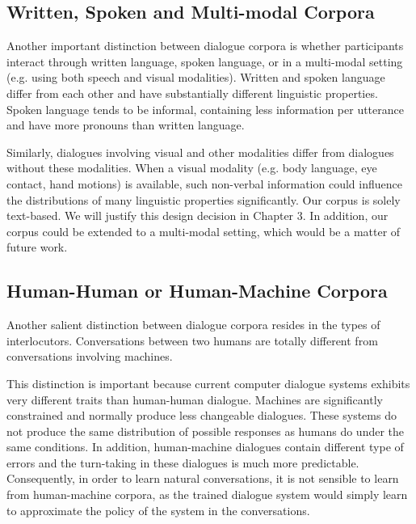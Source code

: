 \documentclass[bsc,frontabs,twoside,singlespacing,parskip,deptreport]{infthesis}     %
\begin{document}
\subsection{Written, Spoken and Multi-modal Corpora}

Another important distinction between dialogue corpora is whether participants interact through written language, spoken language, or in a multi-modal setting (e.g. using both speech and visual modalities). Written and spoken language differ from each other and have substantially different linguistic properties. Spoken language tends to be informal, containing less information per utterance and have more pronouns than written language\cite{carter2006cambridge,biber2001diachronic}.

Similarly, dialogues involving visual and other modalities differ from dialogues without these modalities\cite{serban2015survey,duncan1983charles}. When a visual modality (e.g. body language, eye contact, hand motions) is available, such non-verbal information could influence the distributions of many linguistic properties significantly\cite{gibson1963perception,lord1974perception,cooper1974control,chartrand1999chameleon,de2013speaker}. Our corpus is solely text-based. We will justify this design decision in Chapter 3. In addition, our corpus could be extended to a multi-modal setting, which would be a matter of future work.

\subsection{Human-Human or Human-Machine Corpora}

Another salient distinction between dialogue corpora resides in the types of interlocutors. Conversations between two humans are totally different from conversations involving machines.

This distinction is important because current computer dialogue systems exhibits very different traits than human-human dialogue\cite{doran2003comparing}. Machines are significantly constrained and normally produce less changeable dialogues. These systems do not produce the same distribution of possible responses as humans do under the same conditions. In addition, human-machine dialogues contain different type of errors and the turn-taking in these dialogues is much more predictable\cite{williams2007partially}. Consequently, in order to learn natural conversations, it is not sensible to learn from human-machine corpora, as the trained dialogue system would simply learn to approximate the policy of the system in the conversations\cite{serban2018survey}.
\end{document}
